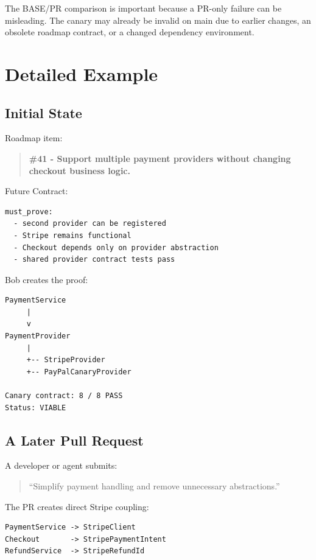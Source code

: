 \documentclass[12pt]{article}
\begin{document}
The BASE/PR comparison is important because a PR-only failure can be misleading. The canary may already be invalid on main due to earlier changes, an obsolete roadmap contract, or a changed dependency environment.

\section{Detailed Example}

\subsection{Initial State}

Roadmap item:

\begin{quote}
\textbf{\#41 - Support multiple payment providers without changing checkout business logic.}
\end{quote}

Future Contract:

\begin{lstlisting}
must_prove:
  - second provider can be registered
  - Stripe remains functional
  - Checkout depends only on provider abstraction
  - shared provider contract tests pass
\end{lstlisting}

Bob creates the proof:

\begin{lstlisting}
PaymentService
     |
     v
PaymentProvider
     |
     +-- StripeProvider
     +-- PayPalCanaryProvider

Canary contract: 8 / 8 PASS
Status: VIABLE
\end{lstlisting}

\subsection{A Later Pull Request}

A developer or agent submits:

\begin{quote}
``Simplify payment handling and remove unnecessary abstractions.''
\end{quote}

The PR creates direct Stripe coupling:

\begin{lstlisting}
PaymentService -> StripeClient
Checkout       -> StripePaymentIntent
RefundService  -> StripeRefundId
\end{lstlisting}
\end{document}
